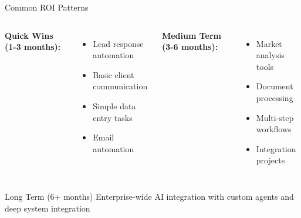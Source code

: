 \documentclass{beamer}
\begin{document}
\begin{frame}{Common ROI Patterns}
  \begin{columns}[onlytextwidth]
      \textbf{Quick Wins (1-3 months):}
      \begin{itemize}
        \item Lead response automation
        \item Basic client communication
        \item Simple data entry tasks
        \item Email automation
      \end{itemize}
      
      \vspace{0.3cm}
      \textbf{Medium Term (3-6 months):}
      \begin{itemize}
        \item Market analysis tools
        \item Document processing
        \item Multi-step workflows
        \item Integration projects
      \end{itemize}
  \end{columns}
  
  \vspace{0.3cm}
  \begin{block}{Long Term (6+ months)}
    Enterprise-wide AI integration with custom agents and deep system integration
  \end{block}
\end{frame}
\end{document}
